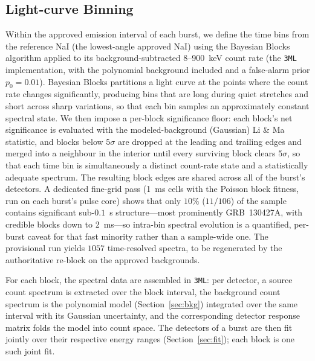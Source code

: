 \documentclass[twocolumn]{aastex631}
\begin{document}
\subsection{Light-curve Binning} \label{sec:bin}
Within the approved emission interval of each burst, we define the time bins
from the reference NaI (the lowest-angle approved NaI) using the Bayesian Blocks
algorithm \citep{Scargle2013} applied to its background-subtracted 8--900~keV
count rate (the \texttt{3ML} implementation, with the polynomial background
included and a false-alarm prior $p_0=0.01$). Bayesian Blocks partitions a light
curve at the points where the count rate changes significantly, producing bins
that are long during quiet stretches and short across sharp variations, so that
each bin samples an approximately constant spectral state. We then impose a
per-block significance floor: each block's net significance is evaluated with
the modeled-background (Gaussian) Li \& Ma statistic, and blocks below $5\sigma$
are dropped at the leading and trailing edges and merged into a neighbour in the
interior until every surviving block clears $5\sigma$, so that each time bin is
simultaneously a distinct count-rate state and a statistically adequate
spectrum. The resulting block edges are shared across all of the burst's
detectors. A dedicated fine-grid pass (1~ms cells with the Poisson block
fitness, run on each burst's pulse core) shows that only $10\%$ ($11/106$) of
the sample contains significant sub-$0.1$~s structure---most prominently
GRB~130427A, with credible blocks down to 2~ms---so intra-bin spectral evolution
is a quantified, per-burst caveat for that fast minority rather than a
sample-wide one. The provisional run yields \textbf{$1057$} time-resolved
spectra, to be regenerated by the authoritative re-block on the approved
backgrounds.

For each block, the spectral data are assembled in \texttt{3ML}: per detector, a
source count spectrum is extracted over the block interval, the background count
spectrum is the polynomial model (Section~\ref{sec:bkg}) integrated over the same
interval with its Gaussian uncertainty, and the corresponding detector response
matrix folds the model into count space. The detectors of a burst are then fit
jointly over their respective energy ranges (Section~\ref{sec:fit}); each block
is one such joint fit.
\end{document}
